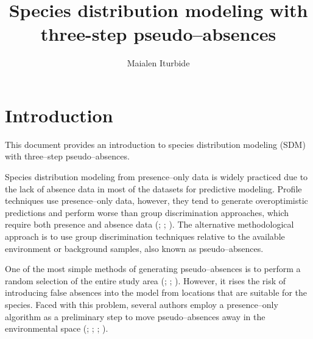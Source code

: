 \documentclass[10pt,a4paper]{report}
\begin{document}













\title{Species distribution modeling with three-step pseudo--absences}
\author{Maialen Iturbide}
\maketitle


\chapter{Introduction}

This document provides an introduction to species distribution modeling (SDM) with three--step pseudo--absences. 

Species distribution modeling from presence--only data is widely practiced due to the lack of absence data in most of the datasets for predictive modeling.  Profile techniques use presence--only data, however, they tend to generate overoptimistic predictions and perform worse than  group discrimination approaches, which require both presence and absence data (\citet{elith_novel_2006}; \citet{engler_improved_2004}; \citet{chefaoui_assessing_2008}). The alternative methodological approach is to use group discrimination techniques relative to the available environment or background samples, also known as pseudo--absences.

One of the most simple methods of generating pseudo--absences is to perform a random selection of the entire study area  (\citet{jiang_satellite-derived_2014}; \citet{maria_teresa_multi-temporal_2014}; \citet{sequeira_predicting_2014}). However, it rises the risk of introducing false absences into the model from locations that are suitable for the species. Faced with this problem, several authors employ a presence--only algorithm as a preliminary step to move pseudo--absences away in the environmental space (\citet{zaniewski_predicting_2002}; \citet{engler_improved_2004}; \citet{barbet-massin_selecting_2012}; \citet{liu_species_2013}). 
\end{document}
